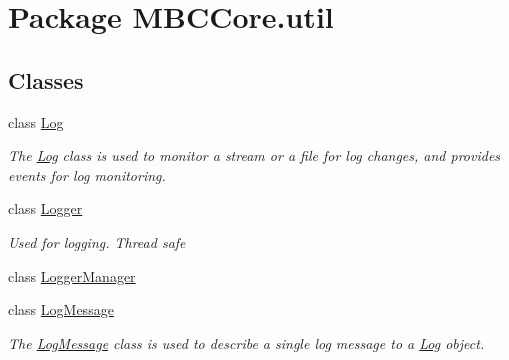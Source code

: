 \hypertarget{namespace_m_b_c_core_1_1util}{\section{Package M\-B\-C\-Core.\-util}
\label{namespace_m_b_c_core_1_1util}
}
\subsection*{Classes}
\begin{DoxyCompactItemize}
\item 
class \hyperlink{class_m_b_c_core_1_1util_1_1_log}{Log}
\begin{DoxyCompactList}\small\item\em The \hyperlink{class_m_b_c_core_1_1util_1_1_log}{Log} class is used to monitor a stream or a file for log changes, and provides events for log monitoring.\end{DoxyCompactList}\item 
class \hyperlink{class_m_b_c_core_1_1util_1_1_logger}{Logger}
\begin{DoxyCompactList}\small\item\em Used for logging. Thread safe\end{DoxyCompactList}\item 
class \hyperlink{class_m_b_c_core_1_1util_1_1_logger_manager}{Logger\-Manager}
\item 
class \hyperlink{class_m_b_c_core_1_1util_1_1_log_message}{Log\-Message}
\begin{DoxyCompactList}\small\item\em The \hyperlink{class_m_b_c_core_1_1util_1_1_log_message}{Log\-Message} class is used to describe a single log message to a \hyperlink{class_m_b_c_core_1_1util_1_1_log}{Log} object.\end{DoxyCompactList}\end{DoxyCompactItemize}
